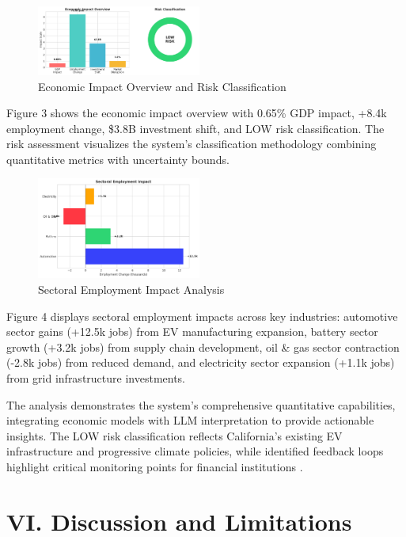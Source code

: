 \documentclass[10pt,twocolumn]{article}
\begin{document}
\begin{figure}[!htb]
\centering
\includegraphics[width=0.48\textwidth]{economic_impact_overview.png}
\caption{Economic Impact Overview and Risk Classification}
\label{fig:economic_impact}
\end{figure}

Figure 3 shows the economic impact overview with 0.65\% GDP impact, +8.4k employment change, \$3.8B investment shift, and LOW risk classification. The risk assessment visualizes the system's classification methodology combining quantitative metrics with uncertainty bounds.

\begin{figure}[!htb]
\centering
\includegraphics[width=0.48\textwidth]{sectoral_employment_impact.png}
\caption{Sectoral Employment Impact Analysis}
\label{fig:sectoral_impact}
\end{figure}

Figure 4 displays sectoral employment impacts across key industries: automotive sector gains (+12.5k jobs) from EV manufacturing expansion, battery sector growth (+3.2k jobs) from supply chain development, oil \& gas sector contraction (-2.8k jobs) from reduced demand, and electricity sector expansion (+1.1k jobs) from grid infrastructure investments.

The analysis demonstrates the system's comprehensive quantitative capabilities, integrating economic models with LLM interpretation to provide actionable insights. The LOW risk classification reflects California's existing EV infrastructure and progressive climate policies, while identified feedback loops highlight critical monitoring points for financial institutions \citep{cardenas2024financial, cardenas2024managing, prosperi2022modelling}.

\section{VI. Discussion and Limitations}
\end{document}
